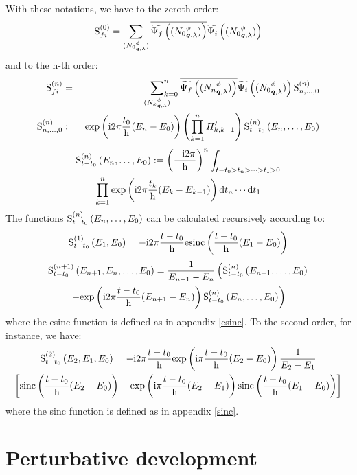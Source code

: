 \documentclass[10pt,a4paper,twoside,openany]{book}
\begin{document}
With these notations, we have to the zeroth order:
\begin{equation*}
\mathrm S_{{f}{i}}^{({0})} = \sum_{({N_0}^{\phi}_{{\boldsymbol{q}}, {\lambda}})} \overline{\widetilde{\Psi_f} \left( ({N_0}^{\phi}_{{\boldsymbol{q}}, {\lambda}}) \right) } \widetilde{\Psi_i} \left( ({N_0}^{\phi}_{{\boldsymbol{q}}, {\lambda}}) \right)
\end{equation*}
and to the n-th order:
\begin{eqnarray*}
\mathrm S_{{f}{i}}^{({n})} & = & \sideset{}{_{k=0}^n}\sum_{({N_k}^{\phi}_{{\boldsymbol{q}}, {\lambda}})} \overline{\widetilde{\Psi_f} \left( ({N_n}^{\phi}_{{\boldsymbol{q}}, {\lambda}}) \right) } \widetilde{\Psi_i} \left( ({N_0}^{\phi}_{{\boldsymbol{q}}, {\lambda}}) \right) \mathrm S^{(n)}_{n,\dotsc,0} \\
\mathrm S^{(n)}_{n,\dotsc,0} & := & \mathrm{exp} \left( {\mathrm{i} 2 \pi \frac{t_0} {\mathrm h} ( E_n - E_0 )} \right) \left( \prod_{k=1}^n H'_{k,k-1} \right) \mathrm S^{(n)}_{t - t_0}\left({E_n, \dotsc, E_0}\right)
\end{eqnarray*}
\begin{multline*}
\mathrm S^{(n)}_{t - t_0}\left({E_n, \dotsc, E_0}\right) := \left( \frac{-\mathrm{i} 2 \pi} {\mathrm h} \right)^n \int_{t - t_0 > t_n > \dotsb > t_1 > 0} \\
\prod_{k=1}^n \mathrm{exp} \left( {\mathrm{i} 2 \pi \frac{t_k} {\mathrm h} ( E_k - E_{k - 1} )} \right) \mathrm dt_n \dotsm \mathrm dt_1
\end{multline*}
The functions $\mathrm S^{(n)}_{t - t_0}\left({E_n, \dotsc, E_0}\right)$ can be calculated recursively according to:
\begin{equation*}
\mathrm S^{(1)}_{t - t_0}\left({E_1, E_0}\right) = -\mathrm{i} 2 \pi \frac{t - t_0} {\mathrm h} \mathrm{esinc} \left( {\frac{t - t_0} {\mathrm h} ( E_1 - E_0 )} \right)
\end{equation*}
\begin{multline*}
\mathrm S^{(n + 1)}_{t - t_0}\left({E_{n + 1}, E_n, \dotsc, E_0}\right) = \frac 1 {E_{n + 1} - E_n} \left( \mathrm S^{(n)}_{t - t_0}\left({E_{n + 1}, \dotsc, E_0}\right) \right. \\
\left. - \mathrm{exp} \left( {\mathrm{i} 2 \pi \frac{t - t_0} {\mathrm h} ( E_{n + 1} - E_n )} \right) \mathrm S^{(n)}_{t - t_0}\left({E_n, \dotsc, E_0}\right) \right)
\end{multline*}
where the esinc function is defined as in appendix \ref{esinc}. To the second order, for instance, we have:
\begin{multline*}
\mathrm S^{(2)}_{t - t_0}\left({E_2, E_1, E_0}\right) = -\mathrm{i} 2 \pi \frac{t - t_0} {\mathrm h} \mathrm{exp} \left( {\mathrm{i} \pi \frac{t - t_0} {\mathrm h} ( E_2 - E_0 )} \right) \frac 1 {E_2 - E_1} \\
\left[ \mathrm{sinc} \left( {\frac{t - t_0} {\mathrm h} ( E_2 - E_0 )} \right) - \mathrm{exp} \left( {\mathrm{i} \pi \frac{t - t_0} {\mathrm h} ( E_2 - E_1 )} \right) \mathrm{sinc} \left( {\frac{t - t_0} {\mathrm h} ( E_1 - E_0 )} \right) \right]
\end{multline*}
where the sinc function is defined as in appendix \ref{sinc}.

\section{Perturbative development}
\end{document}

